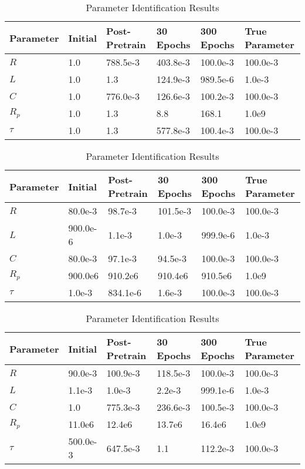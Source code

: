 \begin{table}[htbp]
\caption{Parameter Identification Results}
\label{tab:experiment1}
\centering
\begin{tabular}{l|llll|l}
\hline
Parameter & Initial & Post-Pretrain & 30 Epochs & 300 Epochs & True Parameter \\
\hline
$R$ & 1.0 & 788.5e-3 & 403.8e-3 & 100.0e-3 & 100.0e-3\\
$L$ & 1.0 & 1.3 & 124.9e-3 & 989.5e-6 & 1.0e-3\\
$C$ & 1.0 & 776.0e-3 & 126.6e-3 & 100.2e-3 & 100.0e-3\\
$R_p$ & 1.0 & 1.3 & 8.8 & 168.1 & 1.0e9\\
$\tau$ & 1.0 & 1.3 & 577.8e-3 & 100.4e-3 & 100.0e-3\\
\hline
\end{tabular}
\end{table}
\begin{table}[htbp]
\caption{Parameter Identification Results}
\label{tab:experiment1}
\centering
\begin{tabular}{l|llll|l}
\hline
Parameter & Initial & Post-Pretrain & 30 Epochs & 300 Epochs & True Parameter \\
\hline
$R$ & 80.0e-3 & 98.7e-3 & 101.5e-3 & 100.0e-3 & 100.0e-3\\
$L$ & 900.0e-6 & 1.1e-3 & 1.0e-3 & 999.9e-6 & 1.0e-3\\
$C$ & 80.0e-3 & 97.1e-3 & 94.5e-3 & 100.0e-3 & 100.0e-3\\
$R_p$ & 900.0e6 & 910.2e6 & 910.4e6 & 910.5e6 & 1.0e9\\
$\tau$ & 1.0e-3 & 834.1e-6 & 1.6e-3 & 100.0e-3 & 100.0e-3\\
\hline
\end{tabular}
\end{table}
\begin{table}[htbp]
\caption{Parameter Identification Results}
\label{tab:experiment1}
\centering
\begin{tabular}{l|llll|l}
\hline
Parameter & Initial & Post-Pretrain & 30 Epochs & 300 Epochs & True Parameter \\
\hline
$R$ & 90.0e-3 & 100.9e-3 & 118.5e-3 & 100.0e-3 & 100.0e-3\\
$L$ & 1.1e-3 & 1.0e-3 & 2.2e-3 & 999.1e-6 & 1.0e-3\\
$C$ & 1.0 & 775.3e-3 & 236.6e-3 & 100.5e-3 & 100.0e-3\\
$R_p$ & 11.0e6 & 12.4e6 & 13.7e6 & 16.4e6 & 1.0e9\\
$\tau$ & 500.0e-3 & 647.5e-3 & 1.1 & 112.2e-3 & 100.0e-3\\
\hline
\end{tabular}
\end{table}